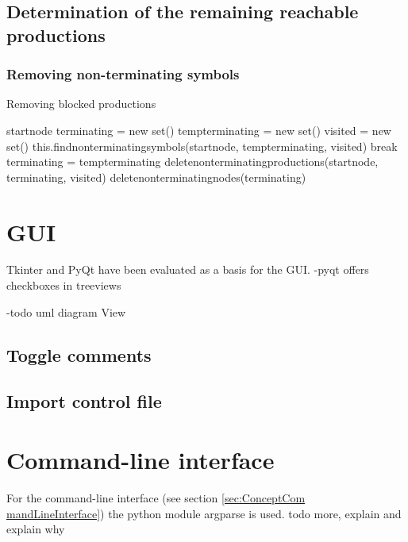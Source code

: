 \subsection{Determination of the remaining reachable productions}
\subsubsection{Removing non-terminating symbols}
\begin{algorithm}[H]
\caption{Removing blocked productions}
\begin{algorithmic}[1] 
\Require start\textunderscore node
\State terminating = new set()
\State temp\textunderscore terminating = new set()
	\State visited = new set()
	\State this.find\textunderscore non\textunderscore terminating\textunderscore symbols(start\textunderscore node, temp\textunderscore terminating, visited)
		\State break
	\Else
		\State terminating = temp\textunderscore terminating
	\EndIf
\EndWhile
\State delete\textunderscore non\textunderscore terminating\textunderscore productions\textunderscore (start\textunderscore node, terminating, visited)
\State delete\textunderscore non\textunderscore terminating\textunderscore nodes(terminating)
\end{algorithmic}
\label{alg:remove_non_terminating_symbols}
\end{algorithm}


\section{GUI}\label{sec:GUI}
Tkinter and PyQt have been evaluated as a basis for the GUI.
-pyqt offers checkboxes in treeviews

-todo uml diagram View
\subsection{Toggle comments}\label{sec:GUI}
\subsection{Import control file}\label{sec:GUI}
\section{Command-line interface}\label{sec:ImplementationCommandLineInterface}
For the command-line interface (see section \ref{sec:ConceptCom mandLineInterface}) the python module argparse is used.
todo more, explain and explain why

